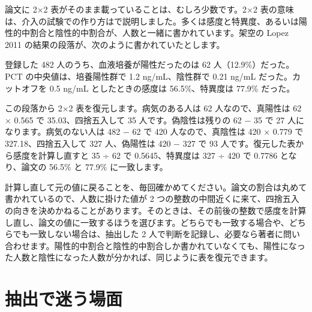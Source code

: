 論文に 2×2 表がそのまま載っていることは、むしろ少数です。2×2 表の意味は、介入の試験での作り方はで説明しました。多くは感度と特異度、あるいは陽性的中割合と陰性的中割合が、人数と一緒に書かれています。架空の Lopez 2011 の結果の段落が、次のように書かれていたとします。

\begin{KKfbox9ao}[演習の素材（架空）]
登録した 482 人のうち、血液培養が陽性だったのは 62 人（12.9\%）だった。PCT の中央値は、培養陽性群で 1.2 ng/mL、陰性群で 0.21 ng/mL だった。カットオフを 0.5 ng/mL としたときの感度は 56.5\%、特異度は 77.9\% だった。
\end{KKfbox9ao}

この段落から 2×2 表を復元します。病気のある人は 62 人なので、真陽性は 62 × 0.565 で 35.03、四捨五入して 35 人です。偽陰性は残りの 62 − 35 で 27 人になります。病気のない人は 482 − 62 で 420 人なので、真陰性は 420 × 0.779 で 327.18、四捨五入して 327 人、偽陽性は 420 − 327 で 93 人です。復元した表から感度を計算し直すと 35 ÷ 62 で 0.5645、特異度は 327 ÷ 420 で 0.7786 となり、論文の 56.5\% と 77.9\% に一致します。

計算し直して元の値に戻ることを、毎回確かめてください。論文の割合は丸めて書かれているので、人数に掛けた値が 2 つの整数の中間近くに来て、四捨五入の向きを決めかねることがあります。そのときは、その前後の整数で感度を計算し直し、論文の値に一致するほうを選びます。どちらでも一致する場合や、どちらでも一致しない場合は、抽出した 2 人で判断を記録し、必要なら著者に問い合わせます。陽性的中割合と陰性的中割合しか書かれていなくても、陽性になった人数と陰性になった人数が分かれば、同じように表を復元できます。

\section{抽出で迷う場面}
\label{sec:12-3}

